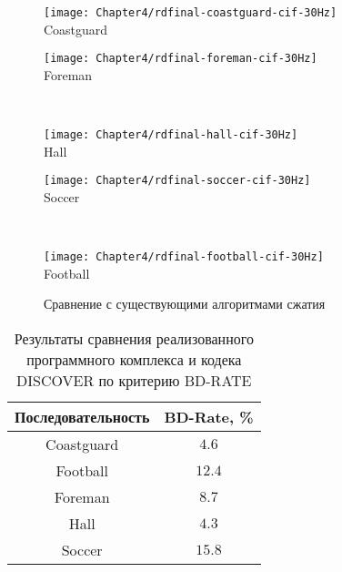\begin{figure}[htbp]
    \begin{center}
        \begin{minipage}{0.45\textwidth}
            \centering\texttt{[image: Chapter4/rdfinal-coastguard-cif-30Hz]} \\ Coastguard
        \end{minipage}
        \begin{minipage}{0.45\textwidth}
            \centering\texttt{[image: Chapter4/rdfinal-foreman-cif-30Hz]} \\ Foreman
        \end{minipage}
        \\
        \begin{minipage}{0.45\textwidth}
            \centering\texttt{[image: Chapter4/rdfinal-hall-cif-30Hz]} \\ Hall
        \end{minipage}
        \begin{minipage}{0.45\textwidth}
            \centering\texttt{[image: Chapter4/rdfinal-soccer-cif-30Hz]} \\ Soccer
        \end{minipage}
        \\
        \begin{minipage}{0.45\textwidth}
            \centering\texttt{[image: Chapter4/rdfinal-football-cif-30Hz]} \\ Football
        \end{minipage}
    \end{center}
    \caption{Сравнение с существующими алгоритмами сжатия}
    \label{fig:FinalDvcComparisonResults}
\end{figure}

\begin{table}[htbp]
    \begin{center}
        \caption{Результаты сравнения реализованного программного комплекса и кодека DISCOVER по критерию BD-RATE}
        \label{tab:ComparisonWithDiscover}
        \begin{tabular}{|c|c|}
            \hline
            {\bfseries Последовательность } & {\bfseries BD-Rate, \%} \\
            \hline
            Coastguard	& $4.6$		\\
            \hline
            Football	& $12.4$ 	\\
            \hline
            Foreman		& $8.7$		\\
            \hline
            Hall 		& $4.3$		\\
            \hline
            Soccer 		& $15.8$	\\
            \hline
        \end{tabular}
    \end{center}
\end{table}


